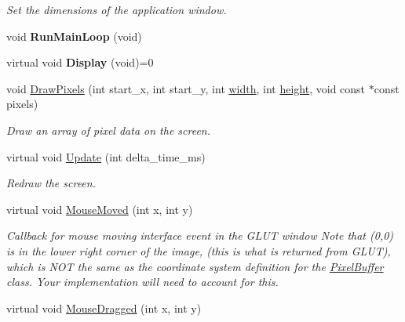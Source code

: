 \begin{DoxyCompactItemize}
\begin{DoxyCompactList}\small\item\em Set the dimensions of the application window. \end{DoxyCompactList}\item 
void {\bfseries Run\+Main\+Loop} (void)\hypertarget{classimage__tools_1_1BaseGfxApp_a62fae03316774a28455f766ce808a814}{}\label{classimage__tools_1_1BaseGfxApp_a62fae03316774a28455f766ce808a814}

\item 
virtual void {\bfseries Display} (void)=0\hypertarget{classimage__tools_1_1BaseGfxApp_aba7ae5ed9a1d794d8c6c4be1d5fa4722}{}\label{classimage__tools_1_1BaseGfxApp_aba7ae5ed9a1d794d8c6c4be1d5fa4722}

\item 
void \hyperlink{classimage__tools_1_1BaseGfxApp_afec9de9223c9fc7acb2d01ec7d5283a2}{Draw\+Pixels} (int start\+\_\+x, int start\+\_\+y, int \hyperlink{classimage__tools_1_1BaseGfxApp_a2fe403c5392f624477c2ce4429f1a7b5}{width}, int \hyperlink{classimage__tools_1_1BaseGfxApp_aa961e13a7a8e6062204223cc33ac7503}{height}, void const $\ast$const pixels)\hypertarget{classimage__tools_1_1BaseGfxApp_afec9de9223c9fc7acb2d01ec7d5283a2}{}\label{classimage__tools_1_1BaseGfxApp_afec9de9223c9fc7acb2d01ec7d5283a2}

\begin{DoxyCompactList}\small\item\em Draw an array of pixel data on the screen. \end{DoxyCompactList}\item 
virtual void \hyperlink{classimage__tools_1_1BaseGfxApp_ad07efe6b7a1f140ccdb9a41d12fc1913}{Update} (int delta\+\_\+time\+\_\+ms)
\begin{DoxyCompactList}\small\item\em Redraw the screen. \end{DoxyCompactList}\item 
virtual void \hyperlink{classimage__tools_1_1BaseGfxApp_ab2aa4111469862051287ba2b9983224d}{Mouse\+Moved} (int x, int y)\hypertarget{classimage__tools_1_1BaseGfxApp_ab2aa4111469862051287ba2b9983224d}{}\label{classimage__tools_1_1BaseGfxApp_ab2aa4111469862051287ba2b9983224d}

\begin{DoxyCompactList}\small\item\em Callback for mouse moving interface event in the G\+L\+UT window Note that (0,0) is in the lower right corner of the image, (this is what is returned from G\+L\+UT), which is N\+OT the same as the coordinate system definition for the \hyperlink{classimage__tools_1_1PixelBuffer}{Pixel\+Buffer} class. Your implementation will need to account for this. \end{DoxyCompactList}\item 
virtual void \hyperlink{classimage__tools_1_1BaseGfxApp_ac4fa9008fc0d0748c45e5bbe610efa45}{Mouse\+Dragged} (int x, int y)\hypertarget{classimage__tools_1_1BaseGfxApp_ac4fa9008fc0d0748c45e5bbe610efa45}{}\label{classimage__tools_1_1BaseGfxApp_ac4fa9008fc0d0748c45e5bbe610efa45}


\end{DoxyCompactItemize}
